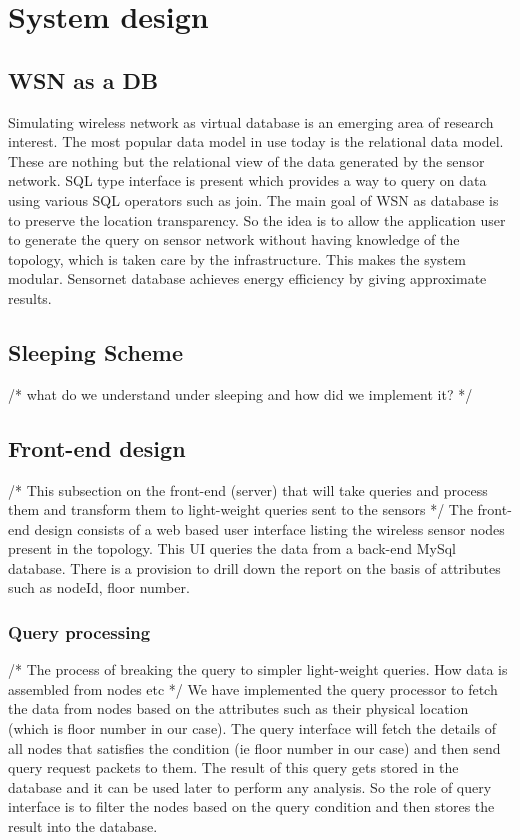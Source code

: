\section{System design}\label{sec:design}

\subsection{WSN as a DB}
 Simulating wireless network as virtual database is an emerging area of research interest. The most popular data model in use today is the relational data model. These are nothing but the relational view of the data generated by the sensor network. SQL type interface is present which provides a way to query on data using various SQL operators such as join. The main goal of WSN as database is to preserve the location transparency. So the idea is to allow the  application user to generate the query on sensor network without having knowledge of the topology, which is taken care by the infrastructure.  This makes the system modular.  Sensornet database achieves energy efficiency by giving approximate results.

\subsection{Sleeping Scheme}
/* what do we understand under sleeping and how did we implement it? */


\subsection{Front-end design}
/* This subsection on the front-end (server) that will take queries and process them and transform them to light-weight queries sent to the sensors */
The front-end design consists of a web based user interface listing the wireless sensor nodes present in the topology. This UI queries the data from a back-end MySql database. There is a provision to drill down the report on the basis of attributes such as nodeId, floor number.

\subsubsection{Query processing}
/* The process of breaking the query to simpler light-weight queries. How data is assembled from nodes etc */
We have implemented the query processor to fetch the data from nodes based on the attributes such as their physical location (which is floor number in our case). The query interface will fetch the details of all nodes that satisfies the condition (ie floor number in our case) and then send query request packets to them. The result of this query gets stored in the database and it can be used later to perform any analysis. So the role of query interface is to filter the nodes based on the query condition and then stores the result into  the database.

